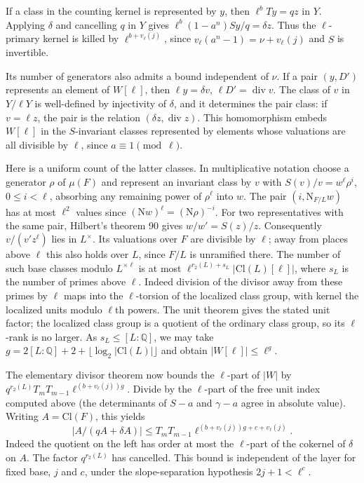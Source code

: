 \documentclass[11pt]{amsart}
\theoremstyle{definition}
\theoremstyle{remark}
\begin{document}
If a class in the counting kernel is represented by $y$, then
$\ell^bTy=qz$ in $Y$. Applying $\delta$ and cancelling $q$ in $Y$
gives $\ell^b(1-a^n)Sy/q=\delta z$. Thus the $\ell$-primary kernel
is killed by $\ell^{b+v_\ell(j)}$, since
$v_\ell(a^n-1)=\nu+v_\ell(j)$ and $S$ is invertible.

Its number of generators also admits a bound independent of $\nu$.
If a pair $(y,D')$ represents an element of $W[\ell]$, then
$\ell y=\delta v$, $\ell D'=\operatorname{div}v$. The class of $v$
in $Y/\ell Y$ is well-defined by injectivity of $\delta$, and it
determines the pair class: if $v=\ell z$, the pair is the relation
$(\delta z,\operatorname{div}z)$. This homomorphism embeds $W[\ell]$
in the $S$-invariant classes represented by elements whose valuations
are all divisible by $\ell$, since $a\equiv1\pmod\ell$.

Here is a uniform count of the latter classes. In multiplicative
notation choose a generator $\rho$ of $\mu(F)$ and represent an
invariant class by $v$ with
$S(v)/v=w^\ell\rho^i$, $0\le i<\ell$, absorbing any remaining
power of $\rho^\ell$ into $w$. The pair $(i,\mathrm N_{F/L}w)$ has
at most $\ell^2$ values since $(\mathrm N w)^\ell=(\mathrm N\rho)^{-i}$.
For two representatives with the same pair, Hilbert's theorem 90
gives $w/w'=S(z)/z$. Consequently $v/(v'z^\ell)$ lies in $L^\times$.
Its valuations over $F$ are divisible by $\ell$; away from places
above $\ell$ this also holds over $L$, since $F/L$ is unramified
there. The number of such base classes modulo $L^{\times\ell}$ is
at most $\ell^{r_2(L)+s_L}|\mathrm{Cl}(L)[\ell]|$, where $s_L$ is
the number of primes above $\ell$. Indeed division of the divisor
away from these primes by $\ell$ maps into the $\ell$-torsion of the
localized class group, with kernel the localized units modulo
$\ell$th powers. The unit theorem gives the stated unit factor;
the localized class group is a quotient of the ordinary class group,
so its $\ell$-rank is no larger. As $s_L\le[L:\mathbb Q]$, we may
take $g=2[L:\mathbb Q]+2+\lfloor\log_2|\mathrm{Cl}(L)|\rfloor$ and
obtain $|W[\ell]|\le\ell^g$.

The elementary divisor theorem now bounds the $\ell$-part of $|W|$
by $q^{r_2(L)}T_mT_{m-1}\ell^{(b+v_\ell(j))g}$.
Divide by the $\ell$-part of the free unit index computed above
(the determinants of $S-a$ and $\gamma-a$ agree in absolute value).
Writing $A=\mathrm{Cl}(F)$, this yields
\[
 |A/(qA+\delta A)|\le
 T_mT_{m-1}\ell^{(b+v_\ell(j))g+c+v_\ell(j)} .
\]
Indeed the quotient on the left has order at most the $\ell$-part
of the cokernel of $\delta$ on $A$. The factor $q^{r_2(L)}$ has
cancelled. This bound is independent of the layer for fixed base,
$j$ and $c$, under the slope-separation hypothesis $2j+1<\ell^c$.
\end{document}
